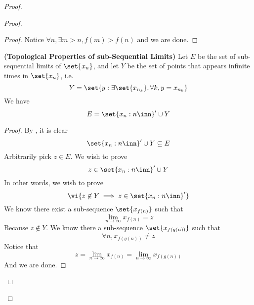 \documentclass{report}
\begin{document}
\begin{proof}
\begin{proof}
\begin{proof}
Notice  $\forall n, \exists m>n, f(m)>f(n)$ and we are done.
\end{proof}
\begin{theorem}
\label{4.4.12}
\textbf{(Topological Properties of sub-Sequential Limits)} Let $E$ be the set of sub-sequential limits of $\set{x_n}$, and let $Y$ be the set of points that appears infinite times in  $\set{x_n}$, i.e.
\begin{equation}
  Y=\set{y:\exists \set{x_{n_k}},\forall k, y=x_{n_k}}
\end{equation}
We have
\begin{equation}
E=\set{x_n:n\inn}' \cup Y
\end{equation}
\end{theorem}
\begin{proof}
By , it is clear 
\begin{equation}
\set{x_n:n\inn}' \cup Y\subseteq E
\end{equation}
Arbitrarily pick $z\in E$. We wish to prove
\begin{equation}
z\in \set{x_n:n\inn}'\cup Y
\end{equation}
In other words, we wish to prove
\begin{equation}
  \vi{z\not\in Y\implies z\in \set{x_n:n\inn}'}
\end{equation}
We know there exist a sub-sequence $\set{x_{f(n)}}$ such that 
\begin{equation}
\lim_{n\to\infty}x_{f(n)}=z
\end{equation}
Because $z\not\in Y$. We know there a sub-sequence $\set{x_{f(g(n))}}$ such that
\begin{equation}
\forall n,x_{f(g(n))}\neq z
\end{equation}
Notice that
 \begin{equation}
z=\lim_{n\to\infty}x_{f(n)}=\lim_{n\to\infty}x_{f(g(n))} 
\end{equation}
And we are done.
\end{proof}
\fbox{\begin{minipage}{39em}


\end{minipage}}
\end{proof}
\end{proof}
\end{document}
